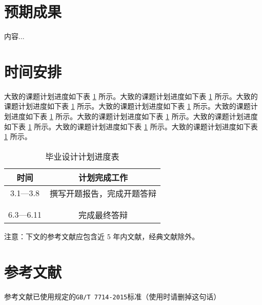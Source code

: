 \documentclass[UTF8,AutoFakeBold,AutoFakeSlant,zihao=-4]{ctexart}
\begin{document}
\newpage
\section{预期成果}
\begin{ubox}
	内容...
\end{ubox}

\newpage
\section{时间安排}
\begin{ubox}
大致的课题计划进度如下表 \ref{tab:progress} 所示。大致的课题计划进度如下表 \ref{tab:progress} 所示。大致的课题计划进度如下表 \ref{tab:progress} 所示。大致的课题计划进度如下表 \ref{tab:progress} 所示。大致的课题计划进度如下表 \ref{tab:progress} 所示。大致的课题计划进度如下表 \ref{tab:progress} 所示。大致的课题计划进度如下表 \ref{tab:progress} 所示。大致的课题计划进度如下表 \ref{tab:progress} 所示。大致的课题计划进度如下表 \ref{tab:progress} 所示。


\renewcommand*\arraystretch{1.5} 
\begin{table}[H]
  \centering
  \caption{毕业设计计划进度表}
  \label{tab:progress}
  \begin{tabular}{@{}cc@{}}
    \toprule
    时间 & 计划完成工作       \\ \midrule
    3.1—3.8 & 撰写开题报告，完成开题答辩 \\\hline
    & \\\hline
    & \\\hline
    6.3—6.11 & 完成最终答辩\\\bottomrule
  \end{tabular}
\end{table}


注意：下文的参考文献应包含近 5 年内文献，经典文献除外。
\end{ubox}

\newpage
\section{参考文献}
\begin{ubox}
参考文献已使用规定的\texttt{GB/T 7714-2015}标准（使用时请删掉这句话）
\printbibliography[heading=none]
\end{ubox}
\end{document}
